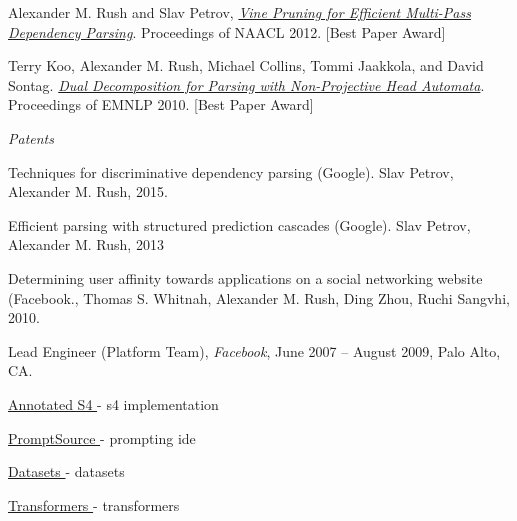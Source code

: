 \documentclass[11pt]{article}
\begin{document}
\ind Alexander M. Rush and Slav Petrov, \emph{\href{http://people.csail.mit.edu/srush/vine-paper.pdf}{Vine Pruning for Efficient Multi-Pass Dependency Parsing}}. Proceedings of NAACL 2012. [Best Paper Award]


\medskip


\ind Terry Koo, Alexander M. Rush, Michael Collins, Tommi Jaakkola, and David Sontag. \emph{\href{http://people.csail.mit.edu/maestro/papers/koo10mstdd.pdf}{Dual Decomposition for Parsing with Non-Projective Head Automata}}. Proceedings of EMNLP 2010. [Best Paper Award]


\vspace{0.1in}

\noindent\emph{Patents \vspace{0.01in}}


\ind Techniques for discriminative dependency parsing (Google). Slav Petrov, Alexander M. Rush, 2015.
\medskip

\ind Efficient parsing with structured prediction cascades (Google). Slav Petrov, Alexander M. Rush, 2013
\medskip

\ind  Determining user affinity towards applications on a social networking website (Facebook., Thomas S. Whitnah, Alexander M. Rush, Ding Zhou, Ruchi Sangvhi, 2010.



\bigskip

\ind  Lead Engineer (Platform Team), {\sl Facebook}, June 2007 -- August 2009, Palo Alto, CA.

\bigskip



\bigskip



\medskip \ind \href{ https://github.com/srush/annotated-s4 }{ Annotated S4 } - s4 implementation



\medskip \ind \href{ https://github.com/bigscience-workshop/promptsource }{ PromptSource } - prompting ide



\medskip \ind \href{ https://github.com/huggingface/datasets }{ Datasets } - datasets



\medskip \ind \href{ https://github.com/huggingface/transformers }{ Transformers } - transformers
\end{document}
